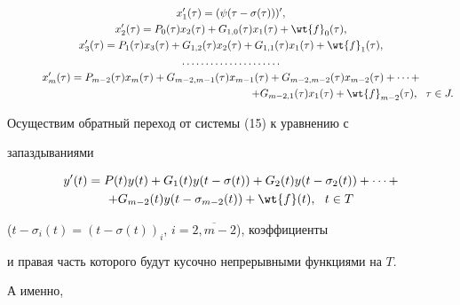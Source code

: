 \begin{gather}


x_1'(\tau)=(\psi (\tau-\sigma(\tau)))',\notag \\


% 


x'_2(\tau)=P_0(\tau)x_2(\tau)+G_{1,0}(\tau)x_1(\tau)+\wt{f}_0(\tau),\notag\\


%


x'_3(\tau)=P_1(\tau)x_3(\tau)+G_{1,2}(\tau)x_2(\tau)+


G_{1,1}(\tau)x_1(\tau)+\wt{f}_1(\tau), \\


%


\dotsc\dotsc\dotsc\dotsc\dotsc\dotsc\dotsc \notag \\


%


x'_m(\tau)=P_{m-2}(\tau)x_m(\tau)+G_{m-2,m-1}(\tau)x_{m-1}(\tau)+


G_{m-2,m-2}(\tau)x_{m-2}(\tau)+ \dotsb +\notag \\


%


\hspace{80mm}+G_{m-2,1}(\tau)x_1(\tau)


+\wt{f}_{m-2}(\tau),\ \ \tau\in J.\notag


\end{gather}





Осуществим обратный переход от системы (15) к уравнению с 


запаздываниями


\begin{multline}


y'(t)=P(t)y(t)+G_1(t)y(t-\sigma(t))+G_2(t)y(t-\sigma_2(t))+\dotsb+ \\


+G_{m-2}(t)y(t-\sigma_{m-2}(t))+\wt{f}(t),\ \ t \in T


\end{multline}


($t-\sigma_i(t)=(t-\sigma(t))_i$, $i=\overline{2,m-2}$), коэффициенты


и правая часть которого будут кусочно непрерывными функциями на $T$. 


А именно,


